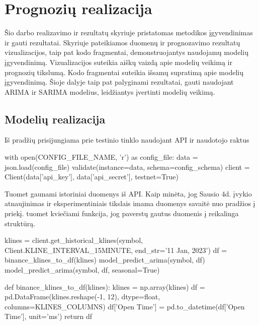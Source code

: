 \documentclass{VUMIFInfKursinis}
\begin{document}

\section{Prognozių realizacija}
Šio darbo realizavimo ir rezultatų skyriuje pristatomas metodikos įgyvendinimas ir gauti rezultatai. 
Skyriuje pateikiamos duomenų ir prognozavimo rezultatų vizualizacijos, taip pat kodo fragmentai, demonstruojantys naudojamų modelių įgyvendinimą.
Vizualizacijos suteikia aiškų vaizdą apie modelių veikimą ir prognozių tikslumą. 
Kodo fragmentai suteikia išsamų supratimą apie modelių įgyvendinimą. 
Šioje dalyje taip pat palyginami rezultatai, gauti naudojant ARIMA ir SARIMA modelius, leidžiantys įvertinti modelių veikimą.
\subsection{Modelių realizacija}

Iš pradžių prisijungiama prie testinio tinklo naudojant API ir naudotojo raktus

\begin{python}
  with open(CONFIG_FILE_NAME, 'r') as config_file:
  	data = json.load(config_file)
  	validate(instance=data, schema=config_schema)
  	client = Client(data['api_key'], data['api_secret'], testnet=True)
\end{python}

Tuomet gaunami istoriniai duomenys iš API. Kaip minėta, jog Sausio 4d. įvykio atnaujinimas ir eksperimentiniais tikslais imama duomenys savaitė nuo pradžios į priekį.
tuomet kviečiami funkcija, jog paverstų gautus duomenis į reikalinga struktūrą.

\begin{python}
  klines = client.get_historical_klines(symbol, Client.KLINE_INTERVAL_15MINUTE, end_str='11 Jan, 2023')
  df = binance_klines_to_df(klines)
  model_predict_arima(symbol, df)
  model_predict_arima(symbol, df, seasonal=True)

  def binance_klines_to_df(klines):
  	klines = np.array(klines)
  	df = pd.DataFrame(klines.reshape(-1, 12), dtype=float, columns=KLINES_COLUMNS)
  	df['Open Time'] = pd.to_datetime(df['Open Time'], unit='ms')
  	return df
\end{python}
\end{document}
